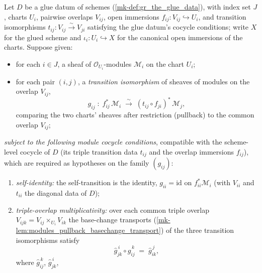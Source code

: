 \begin{definition}\label{mk-def:scheme_modules_glue}
  \leanok

  Let \(D\) be a glue datum of schemes (\ref{mk-def:gr_the_glue_data}), with index set \(J\), charts \(U_i\),
  pairwise overlaps \(V_{ij}\), open immersions
  \(f_{ij} : V_{ij} \hookrightarrow U_i\), and transition isomorphisms
  \(t_{ij} : V_{ij} \xrightarrow{\sim} V_{ji}\) satisfying the glue datum's
  cocycle conditions; write \(X\) for the glued scheme and
  \(\iota_i : U_i \hookrightarrow X\) for the canonical open immersions of the
  charts. Suppose given:
  \begin{itemize}
    \item for each \(i \in J\), a sheaf of \(\mathcal{O}_{U_i}\)-modules \(\mathcal{M}_i\) on the chart \(U_i\);
    \item for each pair \((i,j)\), a \emph{transition isomorphism} of sheaves of
      modules on the overlap \(V_{ij}\),
      \[
        g_{ij} \;:\; f_{ij}^{*}\,\mathcal{M}_i
          \;\xrightarrow{\ \sim\ }\;
        (t_{ij} \circ f_{ji})^{*}\,\mathcal{M}_j,
      \]
      comparing the two charts' sheaves after restriction (pullback) to the
      common overlap \(V_{ij}\);
  \end{itemize}
  \emph{subject to the following module cocycle conditions}, compatible with the
  scheme-level cocycle of \(D\) (its triple transition data \(t_{ij}\) and the
  overlap immersions \(f_{ij}\)), which are required as hypotheses on the family
  \((g_{ij})\):
  \begin{enumerate}
    \item[(C1)] \emph{self-identity:} the self-transition is the identity,
      \(g_{ii} = \mathrm{id}\) on \(f_{ii}^{*}\mathcal{M}_i\) (with
      \(V_{ii}\) and \(t_{ii}\) the diagonal data of \(D\));
    \item[(C2)] \emph{triple-overlap multiplicativity:} over each common triple
      overlap \(V_{ijk} = V_{ij} \times_{U_i} V_{ik}\) the base-change transports
      (\ref{mk-lem:modules_pullback_basechange_transport}) of the three transition
      isomorphisms satisfy
      \[
        \widehat{g}_{jk}^{\,i} \circ \widehat{g}_{ij}^{\,k}
          \;=\; \widehat{g}_{ik}^{\,j},
      \]
      where \(\widehat{g}_{ij}^{\,k}\), \(\widehat{g}_{jk}^{\,i}\),

\end{enumerate}
\end{definition}
